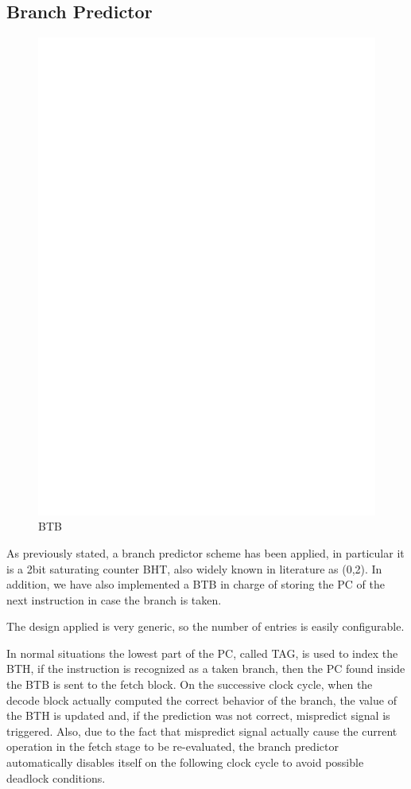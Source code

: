 \documentclass[12pt]{article}
\begin{document}
\subsection{Branch Predictor}
\begin{figure}[h!]
	\includegraphics[width=\textwidth, center]{images/BTB.eps}
	\caption{BTB}
	\label{Branch Predictor Block Schematic}
\end{figure}
As previously stated, a branch predictor scheme has been applied, in particular it is a 2bit saturating counter BHT, also widely known in literature as (0,2). In addition, we have also implemented a BTB in charge of storing the PC of the next instruction in case the branch is taken.

The design applied is very generic, so the number of entries is easily configurable.

In normal situations the lowest part of the PC, called TAG, is used to index the BTH, if the instruction is recognized as a taken branch, then the PC found inside the BTB is sent to the fetch block. On the successive clock cycle, when the decode block actually computed the correct behavior of the branch, the value of the BTH is updated and, if the prediction was not correct, mispredict signal is triggered.
Also, due to the fact that mispredict signal actually cause the current operation in the fetch stage to be re-evaluated, the branch predictor automatically disables itself on the following clock cycle to avoid possible deadlock conditions.
\end{document}
